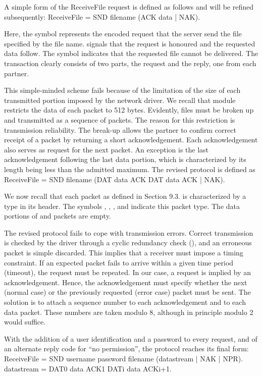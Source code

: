 A simple form of the ReceiveFile request is defined as follows and will be refined subsequently:
\begintt
ReceiveFile = SND filename (ACK data | NAK).
\endtt

\noindent Here, the symbol  represents the encoded request that the server send the file specified by the file name.  signals that the request is honoured and the requested data follow. The  symbol indicates that the requested file cannot be delivered. The transaction clearly consists of two parts, the request and the reply, one from each partner.

This simple-minded scheme fails because of the limitation of the size of each transmitted portion imposed by the network driver. We recall that module  restricts the data of each packet to 512 bytes. Evidently, files must be broken up and transmitted as a sequence of packets. The reason for this restriction is transmission reliability. The break-up allows the partner to confirm correct receipt of a packet by returning a short acknowledgement. Each acknowledgement also serves as request for the next packet. An exception is the last acknowledgement following the last data portion, which is characterized by its length being less than the admitted maximum. The revised protocol is defined as
\begintt
ReceiveFile = SND filename (DAT data ACK {DAT data ACK} | NAK).
\endtt

\noindent We now recall that each packet as defined in Section 9.3. is characterized by a type in its header. The symbols , , , and  indicate this packet type. The data portions of  and  packets are empty.

The revised protocol fails to cope with transmission errors. Correct transmission is checked by the driver through a cyclic redundancy check (), and an erroneous packet is simple discarded. This implies that a receiver must impose a timing constraint. If an expected packet fails to arrive within a given time period (timeout), the request must be repeated. In our case, a request is implied by an acknowledgement. Hence, the acknowledgement must specify whether the next (normal case) or the previously requested (error case) packet must be sent. The solution is to attach a sequence number to each acknowledgement and to each data packet. These numbers are taken modulo 8, although in principle modulo 2 would suffice.

With the addition of a user identification and a password to every request, and of an alternate reply code  for ``no permission'', the protocol reaches its final form:
\begintt
ReceiveFile = SND username password filename (datastream | NAK | NPR).
datastream = DAT0 data ACK1 {DATi data ACKi+1}.
\endtt

